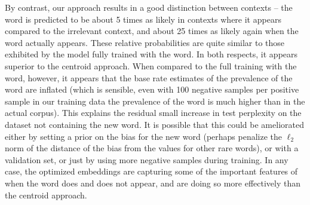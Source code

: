 \documentclass{article}
\begin{document}
By contrast, our approach results in a good distinction between contexts -- the word is predicted to be about 5 times as likely in contexts where it appears compared to the irrelevant context, and about 25 times as likely again when the word actually appears. These relative probabilities are quite similar to those exhibited by the model fully trained with the word. In both respects, it appears superior to the centroid approach. When compared to the full training with the word, however, it appears that the base rate estimates of the prevalence of the word are inflated (which is sensible, even with 100 negative samples per positive sample in our training data the prevalence of the word is much higher than in the actual corpus). This explains the residual small increase in test perplexity on the dataset not containing the new word. It is possible that this could be ameliorated either by setting a prior on the bias for the new word (perhaps penalize the \(\ell_2\) norm of the distance of the bias from the values for other rare words), or with a validation set, or just by using more negative samples during training. In any case, the optimized embeddings are capturing some of the important features of when the word does and does not appear, and are doing so more effectively than the centroid approach.
\end{document}
